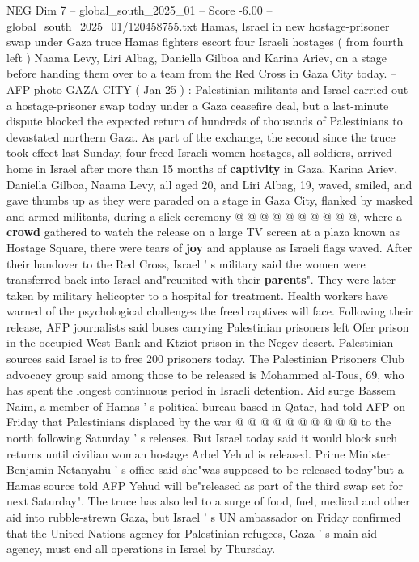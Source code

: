 \begin{textsample}{NEG Dim 7 – global\_south\_2025\_01 – Score -6.00 – global\_south\_2025\_01/120458755.txt}  \label{ex:f7_neg_197}
Hamas, Israel in new hostage-prisoner swap under Gaza truce Hamas fighters escort four Israeli hostages ( from fourth left ) Naama Levy, Liri Albag, Daniella Gilboa and Karina Ariev, on a stage before handing them over to a team from the Red Cross in Gaza City today. -- AFP photo GAZA CITY ( Jan 25 ) : Palestinian militants and Israel carried out a hostage-prisoner swap today under a Gaza ceasefire deal, but a last-minute dispute blocked the expected return of hundreds of thousands of Palestinians to devastated northern Gaza.
As part of the exchange, the second since the truce took effect last Sunday, four freed Israeli women hostages, all soldiers, arrived home in Israel after more than 15 months of \textbf{captivity} in Gaza.
Karina Ariev, Daniella Gilboa, Naama Levy, all aged 20, and Liri Albag, 19, waved, smiled, and gave thumbs up as they were paraded on a stage in Gaza City, flanked by masked and armed militants, during a slick ceremony @ @ @ @ @ @ @ @ @ @, where a \textbf{crowd} gathered to watch the release on a large TV screen at a plaza known as Hostage Square, there were tears of \textbf{joy} and applause as Israeli flags waved.
After their handover to the Red Cross, Israel ' s military said the women were transferred back into Israel and"reunited with their \textbf{parents}".
They were later taken by military helicopter to a hospital for treatment.
Health workers have warned of the psychological challenges the freed captives will face.
Following their release, AFP journalists said buses carrying Palestinian prisoners left Ofer prison in the occupied West Bank and Ktziot prison in the Negev desert.
Palestinian sources said Israel is to free 200 prisoners today.
The Palestinian Prisoners Club advocacy group said among those to be released is Mohammed al-Tous, 69, who has spent the longest continuous period in Israeli detention.
Aid surge Bassem Naim, a member of Hamas ' s political bureau based in Qatar, had told AFP on Friday that Palestinians displaced by the war @ @ @ @ @ @ @ @ @ @ to the north following Saturday ' s releases.
But Israel today said it would block such returns until civilian woman hostage Arbel Yehud is released.
Prime Minister Benjamin Netanyahu ' s office said she"was supposed to be released today"but a Hamas source told AFP Yehud will be"released as part of the third swap set for next Saturday".
The truce has also led to a surge of food, fuel, medical and other aid into rubble-strewn Gaza, but Israel ' s UN ambassador on Friday confirmed that the United Nations agency for Palestinian refugees, Gaza ' s main aid agency, must end all operations in Israel by Thursday.

\end{textsample}
